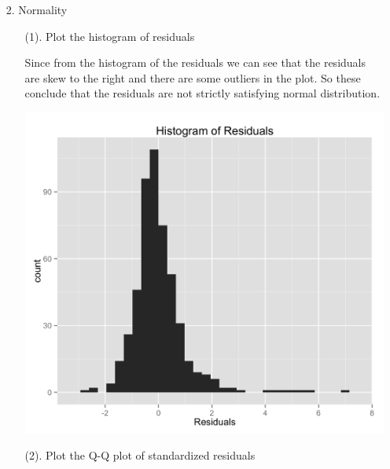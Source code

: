 \documentclass[10pt,letterpaper]{article}
\begin{document}
\begin{enumerate}[leftmargin=0cm,itemindent=.5cm,labelwidth=\itemindent,labelsep=0cm,align=left]
\begin{enumerate}[leftmargin=0cm,itemindent=.5cm,labelwidth=\itemindent,labelsep=0cm,align=left]
\item[2. ] Normality
\begin{enumerate}[leftmargin=0cm,itemindent=.5cm,labelwidth=\itemindent,labelsep=0cm,align=left]
\item[(1). ] Plot the histogram of residuals

Since from the histogram of the residuals we can see that the residuals are skew to the right and there are some outliers in the plot. So these conclude that the residuals are not strictly satisfying normal distribution. 
\begin{center}
\includegraphics[scale=0.16]{residhist}
\end{center}

\item[(2). ] Plot the Q-Q plot of standardized residuals


\end{enumerate}
\end{enumerate}
\end{enumerate}
\end{document}

